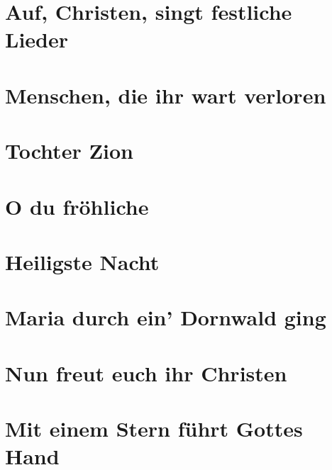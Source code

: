 \documentclass[11pt]{article}
\begin{document}
\section{Auf, Christen, singt festliche Lieder}

\section{Menschen, die ihr wart verloren}

\section{Tochter Zion}

\section{O du fröhliche}

\section{Heiligste Nacht}

\section{Maria durch ein' Dornwald ging}

\section{Nun freut euch ihr Christen}

\section{Mit einem Stern führt Gottes Hand}
\end{document}
